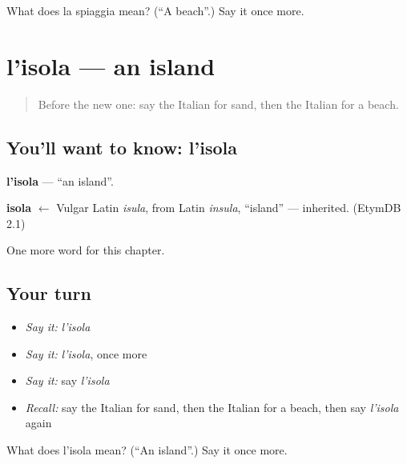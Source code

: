 \begin{tcolorbox}[breakable,colback=teal!4,colframe=teal!35!black,title={Before you move on}]
What does la spiaggia mean? (\textquotedblleft{}A beach\textquotedblright{}.) Say it once more.
\end{tcolorbox}
\section[l'isola]{l'isola — an island}

\label{lesson:IT-C66-isola}



\begin{quote}
Before the new one: say the Italian for sand, then the Italian for a beach.
\end{quote}

\subsection*{You'll want to know: l'isola}
\textbf{l'isola} — \textquotedblleft{}an island\textquotedblright{}.

\begin{cousinweb}
\textbf{isola} $\leftarrow$ Vulgar Latin \emph{isula}, from Latin \emph{insula}, \textquotedblleft{}island\textquotedblright{} — inherited. (EtymDB 2.1)
\end{cousinweb}

\begin{grammarlens}[title={What you've built}]
One more word for this chapter.
\end{grammarlens}

\subsection*{Your turn}
\begin{itemize}
\raggedright
  \item \emph{Say it:} \emph{l'isola}
  \item \emph{Say it:} \emph{l'isola}, once more
  \item \emph{Say it:} say \emph{l'isola}
  \item \emph{Recall:} say the Italian for sand, then the Italian for a beach, then say \emph{l'isola} again
\end{itemize}

\begin{tcolorbox}[breakable,colback=teal!4,colframe=teal!35!black,title={Before you move on}]
What does l'isola mean? (\textquotedblleft{}An island\textquotedblright{}.) Say it once more.
\end{tcolorbox}

